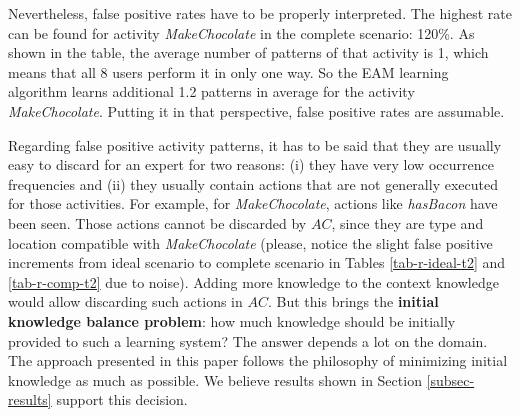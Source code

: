 Nevertheless, false positive rates have to be properly interpreted. The highest rate can be found for activity \textit{MakeChocolate} in the complete scenario: 120\%. As shown in the table, the average number of patterns of that activity is 1, which means that all 8 users perform it in only one way. So the EAM learning algorithm learns additional 1.2 patterns in average for the activity \textit{MakeChocolate}. Putting it in that perspective, false positive rates are assumable.

Regarding false positive activity patterns, it has to be said that they are usually easy to discard for an expert for two reasons: (i) they have very low occurrence frequencies and (ii) they usually contain actions that are not generally executed for those activities. For example, for \textit{MakeChocolate}, actions like \textit{hasBacon} have been seen. Those actions cannot be discarded by $AC$, since they are type and location compatible with \textit{MakeChocolate} (please, notice the slight false positive increments from ideal scenario to complete scenario in Tables \ref{tab-r-ideal-t2} and \ref{tab-r-comp-t2} due to noise). Adding more knowledge to the context knowledge would allow discarding such actions in $AC$. But this brings the \textbf{initial knowledge balance problem}: how much knowledge should be initially provided to such a learning system? The answer depends a lot on the domain. The approach presented in this paper follows the philosophy of minimizing initial knowledge as much as possible. We believe results shown in Section \ref{subsec-results} support this decision.  